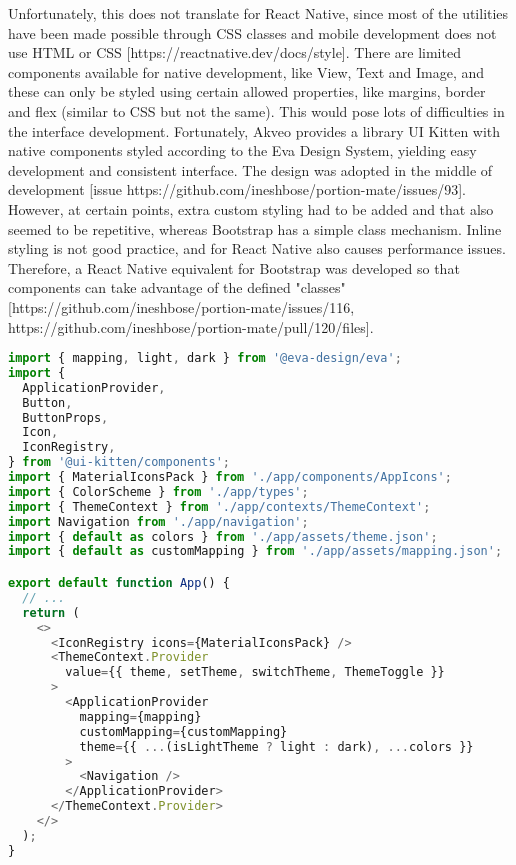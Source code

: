 \documentclass{l4proj}
\begin{document}
Unfortunately, this does not translate for React Native, since most of the utilities have been made possible through CSS classes and mobile development does not use HTML or CSS [https://reactnative.dev/docs/style]. There are limited components available for native development, like View, Text and Image, and these can only be styled using certain allowed properties, like margins, border and flex (similar to CSS but not the same). This would pose lots of difficulties in the interface development. Fortunately, Akveo provides a library UI Kitten with native components styled according to the Eva Design System, yielding easy development and consistent interface. The design was adopted in the middle of development [issue https://github.com/ineshbose/portion-mate/issues/93]. However, at certain points, extra custom styling had to be added and that also seemed to be repetitive, whereas Bootstrap has a simple class mechanism. Inline styling is not good practice, and for React Native also causes performance issues. Therefore, a React Native equivalent for Bootstrap was developed so that components can take advantage of the defined "classes" [https://github.com/ineshbose/portion-mate/issues/116, https://github.com/ineshbose/portion-mate/pull/120/files].

\begin{lstlisting}[language=typescript, caption={root definition of App, using Eva Design and UI Kitten components in \href{https://github.com/ineshbose/portion-mate/blob/c51ee3f32d05df641157467169e9659732202b7b/src/app/App.tsx\#L28}{\code{./src/App.tsx}}}]
import { mapping, light, dark } from '@eva-design/eva';
import {
  ApplicationProvider,
  Button,
  ButtonProps,
  Icon,
  IconRegistry,
} from '@ui-kitten/components';
import { MaterialIconsPack } from './app/components/AppIcons';
import { ColorScheme } from './app/types';
import { ThemeContext } from './app/contexts/ThemeContext';
import Navigation from './app/navigation';
import { default as colors } from './app/assets/theme.json';
import { default as customMapping } from './app/assets/mapping.json';

export default function App() {
  // ...
  return (
    <>
      <IconRegistry icons={MaterialIconsPack} />
      <ThemeContext.Provider
        value={{ theme, setTheme, switchTheme, ThemeToggle }}
      >
        <ApplicationProvider
          mapping={mapping}
          customMapping={customMapping}
          theme={{ ...(isLightTheme ? light : dark), ...colors }}
        >
          <Navigation />
        </ApplicationProvider>
      </ThemeContext.Provider>
    </>
  );
}
\end{lstlisting}
\end{document}
